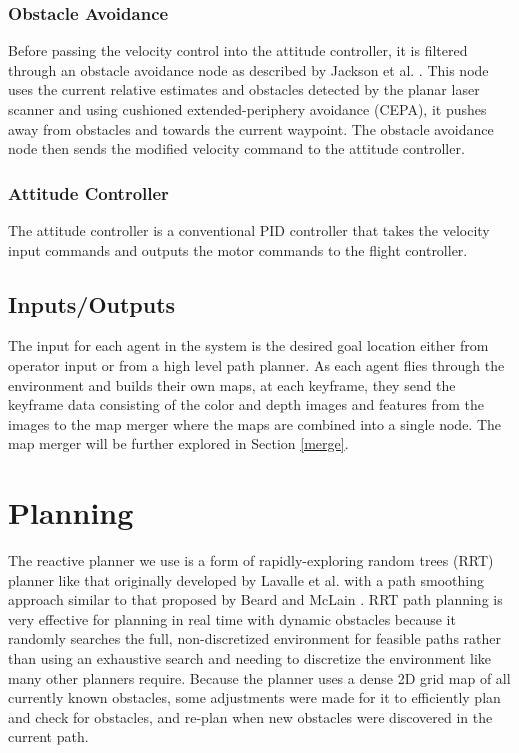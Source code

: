\documentclass[letterpaper, 10 pt, conference]{ieeeconf}  %
\begin{document}
\subsubsection{Obstacle Avoidance} \label{obs_avoid}

Before passing the velocity control into the attitude controller, it is filtered through an obstacle avoidance node as described by Jackson et al. \cite{Jackson2016}. This node uses the current relative estimates and obstacles detected by the planar laser scanner and using cushioned extended-periphery avoidance (CEPA), it pushes away from obstacles and towards the current waypoint. The obstacle avoidance node then sends the modified velocity command to the attitude controller.

\subsubsection{Attitude Controller}

The attitude controller is a conventional PID controller that takes the velocity input commands and outputs the motor commands to the flight controller.

\subsection{Inputs/Outputs}

The input for each agent in the system is the desired goal location either from operator input or from a high level path planner. As each agent flies through the environment and builds their own maps, at each keyframe, they send the keyframe data consisting of the color and depth images and features from the images to the map merger where the maps are combined into a single node. The map merger will be further explored in Section \ref{merge}.

\section{Planning}\label{planning}

The reactive planner we use is a form of rapidly-exploring random trees (RRT) planner like that originally developed by Lavalle et al. \cite{Lavalle1998} with a path smoothing approach similar to that proposed by Beard and McLain \cite{Beard2012}. RRT path planning is very effective for planning in real time with dynamic obstacles because it randomly searches the full, non-discretized environment for feasible paths rather than using an exhaustive search and needing to discretize the environment like many other planners require. Because the planner uses a dense 2D grid map of all currently known obstacles, some adjustments were made for it to efficiently plan and check for obstacles, and re-plan when new obstacles were discovered in the current path.
\end{document}
